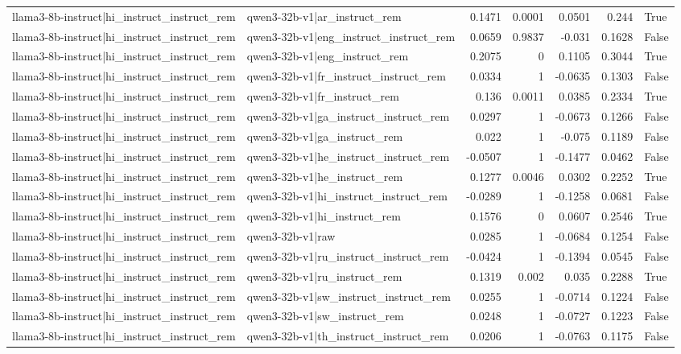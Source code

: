 \begin{table}
\begin{tabular}{l l r r r r l}
llama3-8b-instruct|hi_instruct_instruct_rem & qwen3-32b-v1|ar_instruct_rem & 0.1471 & 0.0001 & 0.0501 & 0.244 & True \\
llama3-8b-instruct|hi_instruct_instruct_rem & qwen3-32b-v1|eng_instruct_instruct_rem & 0.0659 & 0.9837 & -0.031 & 0.1628 & False \\
llama3-8b-instruct|hi_instruct_instruct_rem & qwen3-32b-v1|eng_instruct_rem & 0.2075 & 0 & 0.1105 & 0.3044 & True \\
llama3-8b-instruct|hi_instruct_instruct_rem & qwen3-32b-v1|fr_instruct_instruct_rem & 0.0334 & 1 & -0.0635 & 0.1303 & False \\
llama3-8b-instruct|hi_instruct_instruct_rem & qwen3-32b-v1|fr_instruct_rem & 0.136 & 0.0011 & 0.0385 & 0.2334 & True \\
llama3-8b-instruct|hi_instruct_instruct_rem & qwen3-32b-v1|ga_instruct_instruct_rem & 0.0297 & 1 & -0.0673 & 0.1266 & False \\
llama3-8b-instruct|hi_instruct_instruct_rem & qwen3-32b-v1|ga_instruct_rem & 0.022 & 1 & -0.075 & 0.1189 & False \\
llama3-8b-instruct|hi_instruct_instruct_rem & qwen3-32b-v1|he_instruct_instruct_rem & -0.0507 & 1 & -0.1477 & 0.0462 & False \\
llama3-8b-instruct|hi_instruct_instruct_rem & qwen3-32b-v1|he_instruct_rem & 0.1277 & 0.0046 & 0.0302 & 0.2252 & True \\
llama3-8b-instruct|hi_instruct_instruct_rem & qwen3-32b-v1|hi_instruct_instruct_rem & -0.0289 & 1 & -0.1258 & 0.0681 & False \\
llama3-8b-instruct|hi_instruct_instruct_rem & qwen3-32b-v1|hi_instruct_rem & 0.1576 & 0 & 0.0607 & 0.2546 & True \\
llama3-8b-instruct|hi_instruct_instruct_rem & qwen3-32b-v1|raw & 0.0285 & 1 & -0.0684 & 0.1254 & False \\
llama3-8b-instruct|hi_instruct_instruct_rem & qwen3-32b-v1|ru_instruct_instruct_rem & -0.0424 & 1 & -0.1394 & 0.0545 & False \\
llama3-8b-instruct|hi_instruct_instruct_rem & qwen3-32b-v1|ru_instruct_rem & 0.1319 & 0.002 & 0.035 & 0.2288 & True \\
llama3-8b-instruct|hi_instruct_instruct_rem & qwen3-32b-v1|sw_instruct_instruct_rem & 0.0255 & 1 & -0.0714 & 0.1224 & False \\
llama3-8b-instruct|hi_instruct_instruct_rem & qwen3-32b-v1|sw_instruct_rem & 0.0248 & 1 & -0.0727 & 0.1223 & False \\
llama3-8b-instruct|hi_instruct_instruct_rem & qwen3-32b-v1|th_instruct_instruct_rem & 0.0206 & 1 & -0.0763 & 0.1175 & False \\

\end{tabular}
\end{table}
